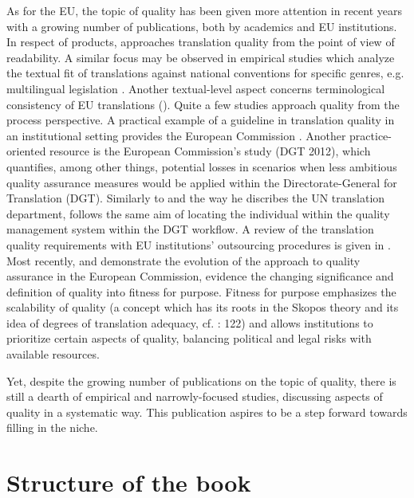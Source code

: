 \documentclass[output=paper]{langsci/langscibook}
\begin{document}
As for the EU, the topic of quality has been given more attention in recent years with a growing number of publications, both by academics and EU institutions. In respect of products, \citet[104--106]{Koskinen2008} approaches translation quality from the point of view of readability. A similar focus may be observed in empirical studies which analyze the textual fit of translations against national conventions for specific genres, e.g. multilingual legislation \citep{Biel2014}. Another textual-level aspect concerns terminological consistency of EU translations (\citealt{PachoAljanati2017}). Quite a few studies approach quality from the process perspective. A practical example of a guideline in translation quality in an institutional setting provides the European Commission \citet{DGT2009}. Another practice-oriented resource is the European Commission’s study (DGT 2012), which quantifies, among other things, potential losses in scenarios when less ambitious quality assurance measures would be applied within the Directorate-General for Translation (DGT). Similarly to \citet{Didaoui2009} and the way he discribes the UN translation department, \citet{Svoboda2008} follows the same aim of locating the individual within the quality management system within the DGT workflow. A review of the translation quality requirements with EU institutions’ outsourcing procedures is given in \citet{Sosoni2011}. Most recently, \citet{Strandvik2015,Strandvik2017} and \citet{Druganforthcoming} demonstrate the evolution of the approach to quality assurance in the European Commission, evidence the changing significance and definition of quality into fitness for purpose. Fitness for purpose emphasizes the scalability of quality (a concept which has its roots in the Skopos theory and its idea of degrees of translation adequacy, cf. \citealt{Nord2010}: 122) and allows institutions to prioritize certain aspects of quality, balancing political and legal risks with available resources. 

Yet, despite the growing number of publications on the topic of quality, there is still a dearth of empirical and narrowly-focused studies, discussing aspects of quality in a systematic way. This publication aspires to be a step forward towards filling in the niche.

\section{Structure of the book}
\end{document}
